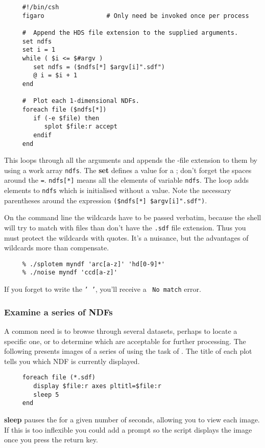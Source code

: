\small
\begin{verbatim}
     #!/bin/csh
     figaro                 # Only need be invoked once per process

     #  Append the HDS file extension to the supplied arguments.
     set ndfs
     set i = 1
     while ( $i <= $#argv )
        set ndfs = ($ndfs[*] $argv[i]".sdf")
        @ i = $i + 1
     end

     #  Plot each 1-dimensional NDFs.
     foreach file ($ndfs[*])
        if (-e $file) then
           splot $file:r accept
        endif
     end
\end{verbatim}
\normalsize
This loops through all the arguments and appends the {\sf
\HDSref}-file extension to them by using a work array {\tt ndfs}.  The
{\bf set} defines a value for a ; don't forget the spaces around the {\tt =}.
{\tt ndfs[*]} means all the elements of variable {\tt ndfs}.  The loop
adds elements to {\tt ndfs} which is initialised without a value.
Note the necessary parentheses around the expression {\tt (\$ndfs[*]
\$argv[i]".sdf")}.

On the command line the wildcards have to be passed verbatim, because
the shell will try to match with files than don't have the {\tt .sdf} 
file extension.  Thus you must protect the wildcards with quotes.
It's a nuisance, but the advantages of wildcards more than compensate.

\small
\begin{verbatim}
     % ./splotem myndf 'arc[a-z]' 'hd[0-9]*'
     % ./noise myndf 'ccd[a-z]'
\end{verbatim}
\normalsize
If you forget to write the {\tt '~'}, you'll receive a ~{\tt No match}
error.

\subsubsection{Examine a series of NDFs
\label{sc4_se_display_series}}

A common need is to browse through several datasets, perhaps to locate
a specific one, or to determine which are acceptable for further
processing.  The following presents images of a series of  using the  task of
\KAPPAref\@.  The title of each plot tells you which NDF is currently
displayed.

\small
\begin{verbatim}
     foreach file (*.sdf)
        display $file:r axes pltitl=$file:r
        sleep 5
     end
\end{verbatim}
\normalsize
{\bf sleep} pauses the  for a given
number of seconds, allowing you to view each image.  If this is too
inflexible you could add a prompt so the script displays the image
once you press the return key.

